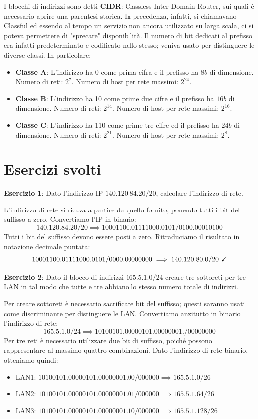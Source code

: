 \noindent I blocchi di indirizzi sono detti \textbf{CIDR}: Classless Inter-Domain Router, sui quali è necessario aprire una parentesi storica. In precedenza, infatti, si chiamavano Classful ed essendo al tempo un servizio non ancora utilizzato su larga scala, ci si poteva permettere di "sprecare" disponibilità. Il numero di bit dedicati al prefisso era infatti predeterminato e codificato nello stesso; veniva usato per distinguere le diverse classi. In particolare: \begin{itemize}
	\item \textbf{Classe A}: L'indirizzo ha 0 come prima cifra e il prefisso ha $8b$ di dimensione. Numero di reti: $2^7$. Numero di host per rete massimi: $2^{24}$.
	\item \textbf{Classe B}: L'indirizzo ha 10 come prime due cifre e il prefisso ha $16b$ di dimensione. Numero di reti: $2^{14}$. Numero di host per rete massimi: $2^{16}$.
	\item \textbf{Classe C}: L'indirizzo ha 110 come prime tre cifre ed il prefisso ha $24b$ di dimensione. Numero di reti: $2^{21}$. Numero di host per rete massimi: $2^8$.
\end{itemize}

%

\section{Esercizi svolti}
\textbf{Esercizio 1}: Dato l'indirizzo IP $140.120.84.20/20$, calcolare l'indirizzo di rete.\newline

\noindent L'indirizzo di rete si ricava a partire da quello fornito, ponendo tutti i bit del suffisso a zero. Convertiamo l'IP in binario: \[
	140.120.84.20/20 \implies 10001100.01111000.0101/0100.00010100
\]
\noindent Tutti i bit del suffisso devono essere posti a zero. Ritraduciamo il risultato in notazione decimale puntata: \[
	10001100.01111000.0101/0000.00000000 \implies 140.120.80.0/20 \text{ \checkmark}
\]

\noindent \textbf{Esercizio 2}: Dato il blocco di indirizzi $165.5.1.0/24$ creare tre sottoreti per tre LAN in tal modo che tutte e tre abbiano lo
stesso numero totale di indirizzi.\newline

\noindent Per creare sottoreti è necessario sacrificare bit del suffisso; questi saranno usati come discriminante per distinguere le LAN. Convertiamo
anzitutto in binario l'indirizzo di rete: \[
	165.5.1.0/24 \implies 10100101.00000101.00000001./00000000
\]
\noindent Per tre reti è necessario utilizzare due bit di suffisso, poiché possono rappresentare al massimo quattro combinazioni. Dato l'indirizzo di
rete binario, otteniamo quindi: \begin{itemize}
	\item LAN1: $10100101.00000101.00000001.00/000000 \implies 165.5.1.0/26$ \checkmark
	\item LAN2: $10100101.00000101.00000001.01/000000 \implies 165.5.1.64/26$ \checkmark
	\item LAN3: $10100101.00000101.00000001.10/000000 \implies 165.5.1.128/26$ \checkmark
\end{itemize}

